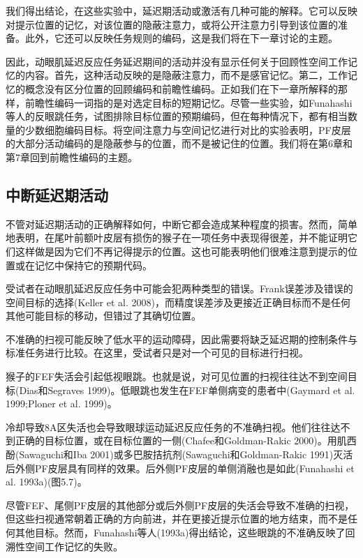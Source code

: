 我们得出结论，在这些实验中，延迟期活动或激活有几种可能的解释。它可以反映对提示位置的记忆，对该位置的隐蔽注意力，或将公开注意力引导到该位置的准备。此外，它还可以反映任务规则的编码，这是我们将在下一章讨论的主题。

因此，动眼肌延迟反应任务延迟期间的活动并没有显示任何关于回顾性空间工作记忆的内容。首先，这种活动反映的是隐蔽注意力，而不是感官记忆。第二，工作记忆的概念没有区分位置的回顾编码和前瞻性编码。正如我们在下一章所解释的那样，前瞻性编码一词指的是对选定目标的短期记忆。尽管一些实验，如Funahashi等人的反眼跳任务，试图排除目标位置的预期编码，但在每种情况下，都有相当数量的少数细胞编码目标。将空间注意力与空间记忆进行对比的实验表明，PF皮层的大部分活动编码的是隐蔽参与的位置，而不是被记住的位置。我们将在第6章和第7章回到前瞻性编码的主题。
\subsection{中断延迟期活动}
不管对延迟期活动的正确解释如何，中断它都会造成某种程度的损害。然而，简单地表明，在尾叶前额叶皮层有损伤的猴子在一项任务中表现得很差，并不能证明它们这样做是因为它们不再记得提示的位置。这也可能表明他们很难注意到提示的位置或在记忆中保持它的预期代码。

受试者在动眼肌延迟反应任务中可能会犯两种类型的错误。Frank误差涉及错误的空间目标的选择(Keller et al. 2008)，而精度误差涉及更接近正确目标而不是任何其他可能目标的移动，但错过了其确切位置。

不准确的扫视可能反映了低水平的运动障碍，因此需要将缺乏延迟期的控制条件与标准任务进行比较。在这里，受试者只是对一个可见的目标进行扫视。

猴子的FEF失活会引起低视眼跳。也就是说，对可见位置的扫视往往达不到空间目标(Dias和Segraves 1999)。低眼跳也发生在FEF单侧病变的患者中(Gaymard et al. 1999;Ploner et al. 1999)。

冷却导致8A区失活也会导致眼球运动延迟反应任务的不准确扫视。他们往往达不到正确的目标位置，或在目标位置的一侧(Chafee和Goldman-Rakic 2000)。用肌西酚(Sawaguchi和Iba 2001)或多巴胺拮抗剂(Sawaguchi和Goldman-Rakic 1991)灭活后外侧PF皮层具有同样的效果。后外侧PF皮层的单侧消融也是如此(Funahashi et al. 1993a)(图5.7)。

尽管FEF、尾侧PF皮层的其他部分或后外侧PF皮层的失活会导致不准确的扫视，但这些扫视通常朝着正确的方向前进，并在更接近提示位置的地方结束，而不是任何其他目标。然而，Funahashi等人(1993a)得出结论，这些眼跳的不准确反映了回溯性空间工作记忆的失败。

